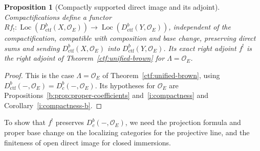 \documentclass[11pt,a4paper]{article}
\numberwithin{equation}{section}
\newtheorem{proposition}[theorem]{Proposition}
\theoremstyle{definition}
\theoremstyle{remark}
\newcommand{\Dbc}{D^b_c}
\newcommand{\Loc}{\operatorname{Loc}}
\newcommand{\Dctf}{D^b_{\mathrm{ctf}}}
\begin{document}
\begin{proposition}[Compactly supported direct image and its adjoint]
\label{i:brown}
Compactifications define a functor
$Rf_!:\Loc(\Dctf(X,\mathcal O_E))\to\Loc(\Dctf(Y,\mathcal O_E))$,
independent of the compactification, compatible with composition and
base change, preserving direct sums and sending
$\Dctf(X,\mathcal O_E)$ into $\Dctf(Y,\mathcal O_E)$. Its exact right adjoint
$f^!$ is the right adjoint of Theorem~\ref{ctf:unified-brown} for
$\Lambda=\mathcal O_E$.
\end{proposition}
\begin{proof}
This is the case $\Lambda=\mathcal O_E$ of
Theorem~\ref{ctf:unified-brown}, using
$\Dctf(-,\mathcal O_E)=\Dbc(-,\mathcal O_E)$. Its hypotheses for
$\mathcal O_E$ are Propositions~\ref{b:prop:proper-coefficients}
and~\ref{i:compactness} and Corollary~\ref{i:compactness-b}.
\end{proof}

To show that $f^!$ preserves $\Dbc(-,\mathcal O_E)$, we need the
projection formula and proper base change on the localizing categories
for the projective line, and the finiteness of open direct image for
closed immersions.
\end{document}
